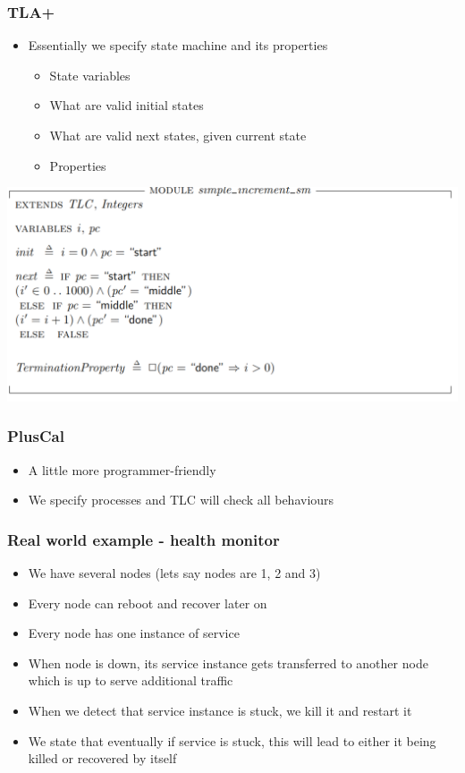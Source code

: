 \documentclass{beamer}
\begin{document}
\begin{frame}
    \frametitle{TLA+}
    \begin{itemize}
        \item Essentially we specify state machine and its properties 
        \begin{itemize}
            \item State variables
            \item What are valid initial states 
            \item What are valid next states, given current state 
            \item Properties
        \end{itemize}
    \end{itemize}
\end{frame}

\begin{frame}[fragile]
    \includegraphics[width=\textwidth]{./sm_increment.png}
\end{frame}

\begin{frame}
    \frametitle{PlusCal}
    \begin{itemize}
        \item A little more programmer-friendly 
        \item We specify processes and TLC will check all behaviours
    \end{itemize}
\end{frame}


\begin{frame}[fragile]
    \frametitle{Real world example - health monitor}
    \begin{itemize}
        \item We have several nodes (lets say nodes are 1, 2 and 3)
        \item Every node can reboot and recover later on 
        \item Every node has one instance of service 
        \item When node is down, its service instance gets transferred to another node which is up to serve additional traffic
        \item When we detect that service instance is stuck, we kill it and restart it 
        \item We state that eventually if service is stuck, this will lead to either it being killed or recovered by itself
    \end{itemize}
\end{frame}
\end{document}
